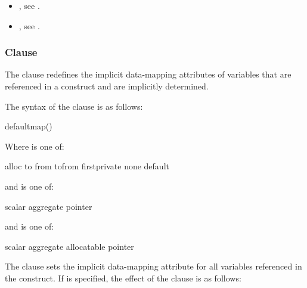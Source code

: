\crossreferences
\begin{itemize}

\item {}, see
.

\item {}, see
.
\end{itemize}




\subsubsection{ Clause}
\label{subsubsec:defaultmap clause}

\summary

The  clause redefines the implicit data-mapping attributes of
variables that are referenced in a  construct and are implicitly
determined.

\syntax
The syntax of the  clause is as follows:

\begin{ompSyntax}
  defaultmap()
\end{ompSyntax}

Where  is one of:
\begin{indentedcodelist}
  alloc
  to
  from
  tofrom
  firstprivate
  none
  default
\end{indentedcodelist}

\begin{ccppspecific}
and  is one of:
\begin{indentedcodelist}
  scalar
  aggregate
  pointer
\end{indentedcodelist}
\end{ccppspecific}

\begin{fortranspecific}
and  is one of:
\begin{indentedcodelist}
  scalar
  aggregate
  allocatable
  pointer
\end{indentedcodelist}
\end{fortranspecific}

\descr
The  clause sets the implicit data-mapping attribute for all variables
referenced in the construct. If  is specified, the effect of
the  clause is as follows:

